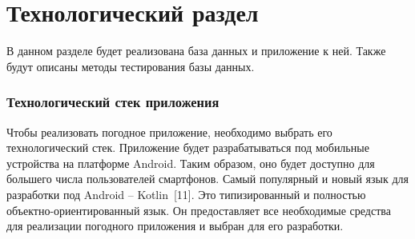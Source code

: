 \chapter{Технологический раздел}
В данном разделе будет реализована база данных и приложение к ней.
Также будут описаны методы тестирования базы данных.
\subsection{Технологический стек приложения}
Чтобы реализовать погодное приложение, необходимо выбрать его технологический стек.
Приложение будет разрабатываться под мобильные устройства на платформе Android.
Таким образом, оно будет доступно для большего числа пользователей смартфонов.
Самый популярный и новый язык для разработки под Android -- Kotlin~[11].
Это типизированный и полностью объектно-ориентированный язык.
Он предоставляет все необходимые средства для реализации погодного приложения и выбран для его разработки.

